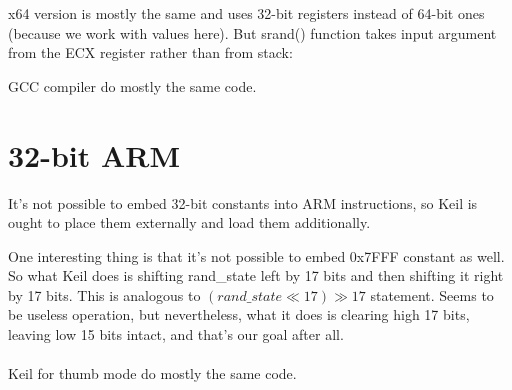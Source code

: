 x64 version is mostly the same and uses 32-bit registers instead of 64-bit ones 
(because we work with \Tint values here).
But srand() function takes input argument from the ECX register rather than from stack:



GCC compiler do mostly the same code.

\section{32-bit ARM}



It's not possible to embed 32-bit constants into ARM instructions, so Keil is ought to place them externally
and load them additionally.

One interesting thing is that it's not possible to embed 0x7FFF constant as well.
So what Keil does is shifting rand\_state left by 17 bits and then shifting it right by 17 bits.
This is analogous to $(rand\_state \ll 17) \gg 17$ statement. 
Seems to be useless operation, but nevertheless,
what it does is clearing high 17 bits, leaving low 15 bits intact, and that's our goal after all.\\
\\
\Optimizing Keil for thumb mode do mostly the same code.

\fi
